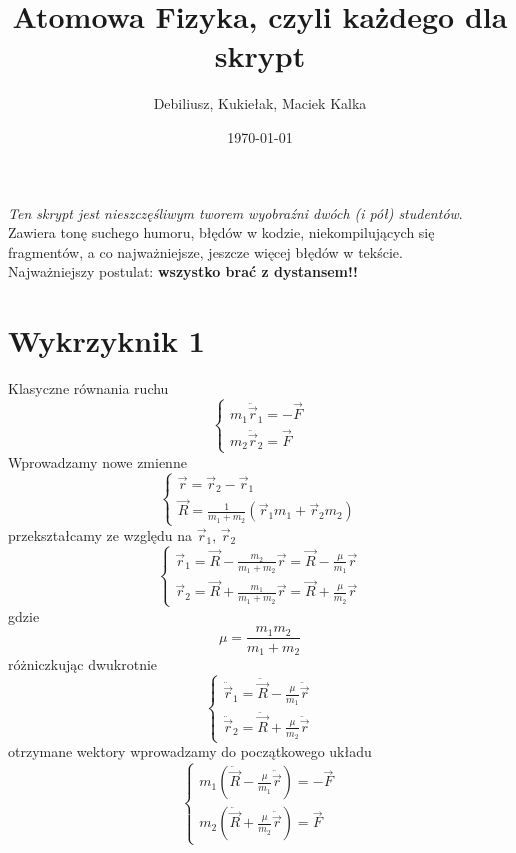 \documentclass[a4paper,12pt]{article}
\title{Atomowa Fizyka, czyli każdego dla skrypt} %
\author{Debiliusz, Kukiełak, Maciek Kalka} %
\date{\today} %
\begin{document}
	\maketitle
  \textit{Ten skrypt jest nieszczęśliwym tworem wyobraźni dwóch (i pół) studentów}. \\
    Zawiera tonę suchego humoru, błędów w kodzie, niekompilujących się 
    fragmentów, a co najważniejsze, jeszcze więcej błędów w tekście.\\
    Najważniejszy postulat: \textbf{wszystko brać z dystansem!!}
    
\section{Wykrzyknik 1}\label{sec:1}
	Klasyczne równania ruchu 
		$$
		\left\{
			\begin{array}{l}
				m_1 \ddot{\vec{r}}_1 = - \vec{F} \\
				m_2 \ddot{\vec{r}}_2 = \vec{F}
			\end{array}	
		\right.
		$$
	Wprowadzamy nowe zmienne
		$$
		\left\{
			\begin{array}{l}
				\vec{r} = \vec{r}_2-\vec{r}_1\\
				\vec{R} = \frac{1}{m_1 + m_2}\left(\vec{r}_1 m_1 + \vec{r}_2 m_2\right)
			\end{array}
		\right.
		$$
	przekształcamy ze względu na $\vec{r}_1,\,\vec{r}_2$
		$$
		\left\{
			\begin{array}{l}
				\vec{r}_1 = \vec{R} - \frac{m_2}{m_1+m_2}\vec{r} = \vec{R} - \frac{\mu}{m_1}\vec{r}\\
				\vec{r}_2 = \vec{R} + \frac{m_1}{m_1+m_2}\vec{r} = \vec{R} + \frac{\mu}{m_2}\vec{r}
			\end{array}
		\right.
		$$
  gdzie 
    \begin{equation*}
      \mu = \frac{m_1 m_2}{m_1 + m_2}
    \end{equation*}
	różniczkując dwukrotnie
		$$
		\left\{
			\begin{array}{l}
				\ddot{\vec{r}}_1 = \ddot{\vec{R}} -  \frac{\mu}{m_1}\ddot{\vec{r}}\\
				\ddot{\vec{r}}_2 = \ddot{\vec{R}}  + \frac{\mu}{m_2}\ddot{\vec{r}}
			\end{array}
		\right.
		$$
	otrzymane wektory wprowadzamy do początkowego układu
		$$
		\left\{
			\begin{array}{l}
				m_1\left( \ddot{\vec{R}} -  \frac{\mu}{m_1}\ddot{\vec{r}} \right)= - \vec{F} \\
				m_2\left(\ddot{\vec{R}}  + \frac{\mu}{m_2}\ddot{\vec{r}} \right)= \vec{F}
			\end{array}	
		\right.
		$$
\end{document}
